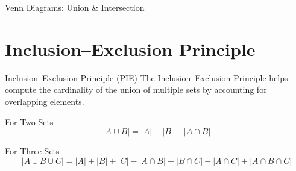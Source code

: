\documentclass{beamer}
\begin{document}
\begin{frame}{Venn Diagrams: Union \& Intersection}
    \begin{figure}[h]
        \centering
    \end{figure}
\end{frame}

\section{Inclusion--Exclusion Principle}
\begin{frame}{Inclusion--Exclusion Principle (PIE)}
    The Inclusion--Exclusion Principle helps compute the cardinality of the union of multiple sets by accounting for overlapping elements.

    \vspace{0.3cm}
    \begin{alertblock}{For Two Sets}
        \[ |A \cup B| = |A| + |B| - |A \cap B| \]
    \end{alertblock}

    \vspace{0.3cm}
    \begin{alertblock}{For Three Sets}
        \[
        |A \cup B \cup C| = |A| + |B| + |C| - |A \cap B| - |B \cap C| - |A \cap C| + |A \cap B \cap C|
        \]
    \end{alertblock}
\end{frame}
\end{document}
